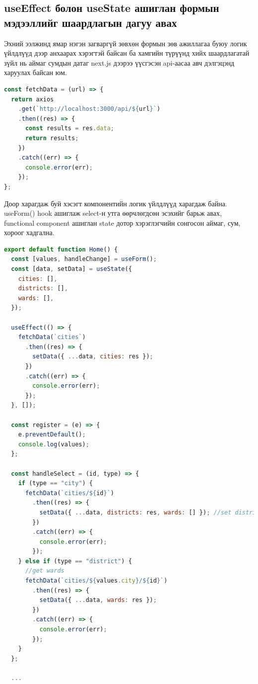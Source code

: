 \subsection{useEffect болон useState ашиглан формын мэдээллийг шаардлагын дагуу авах}

Эхний ээлжинд ямар нэгэн загваргүй зөвхөн формын зөв ажиллагаа буюу логик үйлдлүүд дээр анхаарах хэрэгтэй байсан ба хамгийн түрүүнд хийх шаардлагатай зүйл нь аймаг сумдын датаг next.js дээрээ үүсгэсэн api-аасаа авч дэлгэцэнд харуулах байсан юм. 

\begin{lstlisting}[language=Javascript, caption=Next.js дээр бичсэн серверээс датагаа татаж авах, frame=single]
const fetchData = (url) => {
  return axios
    .get(`http://localhost:3000/api/${url}`)
    .then((res) => {
      const results = res.data;
      return results;
    })
    .catch((err) => {
      console.error(err);
    });
};
\end{lstlisting}

Доор харагдаж буй хэсэгт компонентийн логик үйлдлүүд харагдаж байна. useForm() hook ашиглаж select-н утга өөрчлөгдсөн эсэхийг барьж авах, functional component ашиглан state дотор хэрэглэгчийн сонгосон аймаг, сум, хороог хадгална. 

\begin{lstlisting}[language=Javascript, caption=Component-н үндсэн логик үйлдлүүд, frame=single]
export default function Home() {
  const [values, handleChange] = useForm();
  const [data, setData] = useState({
    cities: [],
    districts: [],
    wards: [],
  });

  useEffect(() => {
    fetchData(`cities`)
      .then((res) => {
        setData({ ...data, cities: res });
      })
      .catch((err) => {
        console.error(err);
      });
  }, []);

  const register = (e) => {
    e.preventDefault();
    console.log(values);
  };

  const handleSelect = (id, type) => {
    if (type == "city") {
      fetchData(`cities/${id}`)
        .then((res) => {
          setData({ ...data, districts: res, wards: [] }); //set districts and clear wards data
        })
        .catch((err) => {
          console.error(err);
        });
    } else if (type == "district") {
      //get wards
      fetchData(`cities/${values.city}/${id}`)
        .then((res) => {
          setData({ ...data, wards: res });
        })
        .catch((err) => {
          console.error(err);
        });
    }
  };
  
  ...
\end{lstlisting}
